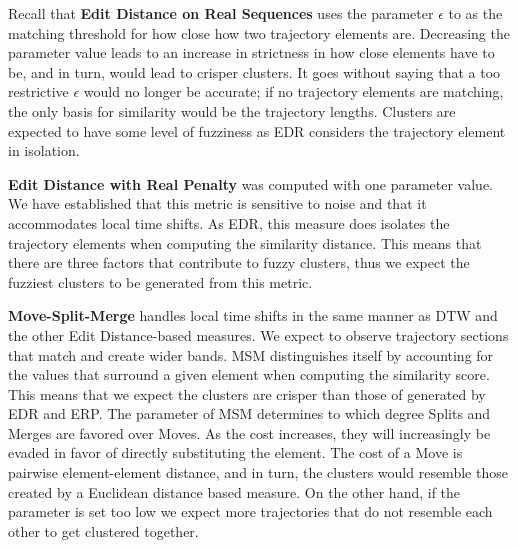 

Recall that \textbf{Edit Distance on Real Sequences} uses the parameter $\epsilon$ to as the matching threshold for how close how two trajectory elements are.
Decreasing the parameter value leads to an increase in strictness in how close elements have to be, and in turn, would lead to crisper clusters.
It goes without saying that a too restrictive $\epsilon$ would no longer be accurate; if no trajectory elements are matching, the only basis for similarity would be the trajectory lengths. 
Clusters are expected to have some level of fuzziness as EDR considers the trajectory element in isolation. 


\textbf{Edit Distance with Real Penalty} was computed with one parameter value.
We have established that this metric is sensitive to noise and that it accommodates local time shifts.
As EDR, this measure does isolates the trajectory elements when computing the similarity distance. 
This means that there are three factors that contribute to fuzzy clusters, thus we expect the fuzziest clusters to be generated from this metric.  


\textbf{Move-Split-Merge} handles local time shifts in the same manner as DTW and the other Edit Distance-based measures.
We expect to observe trajectory sections that match and create wider bands. 
MSM distinguishes itself by accounting for the values that surround a given element when computing the similarity score. 
This means that we expect the clusters are crisper than those of generated by EDR and ERP. 
The parameter of MSM determines to which degree Splits and Merges are favored over Moves. 
As the cost increases, they will increasingly be evaded in favor of directly substituting the element. 
The cost of a Move is pairwise element-element distance, and in turn, the clusters would resemble those created by a Euclidean distance based measure. 
On the other hand, if the parameter is set too low we expect more trajectories that do not resemble each other to get clustered together. 


